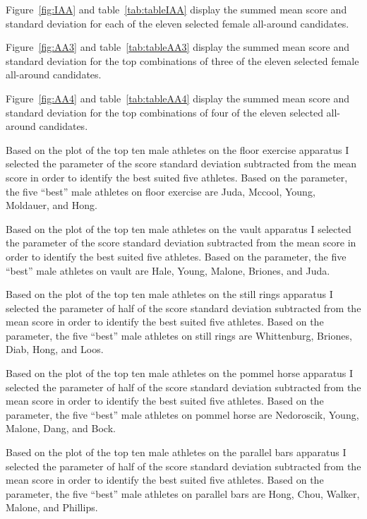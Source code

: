 \documentclass[12pt]{article}
\begin{document}
Figure~\ref{fig:IAA} and table~\ref{tab:tableIAA} display the summed mean score and standard deviation 
for each of the eleven selected female all-around candidates.





Figure~\ref{fig:AA3} and table~\ref{tab:tableAA3} display the summed mean score and standard deviation 
for the top combinations of three of the eleven selected female all-around candidates.



Figure~\ref{fig:AA4} and table~\ref{tab:tableAA4} display the summed mean score and standard deviation 
for the top combinations of four of the eleven selected all-around candidates.


  Based on the plot of the top ten male athletes on the floor exercise apparatus I selected the parameter of 
  the score standard deviation subtracted from the mean score in order to identify the best suited five 
  athletes. Based on the parameter, the five ``best'' male athletes on floor exercise are Juda, Mccool, Young, Moldauer, 
  and Hong.

  Based on the plot of the top ten male athletes on the vault apparatus I selected the parameter of 
  the score standard deviation subtracted from the mean score in order to identify the best suited five 
  athletes. Based on the parameter, the five ``best'' male athletes on vault are Hale, Young, Malone, Briones, and 
  Juda.

  Based on the plot of the top ten male athletes on the still rings apparatus I selected the parameter of 
  half of the score standard deviation subtracted from the mean score in order to identify the best suited five 
  athletes. Based on the parameter, the five ``best'' male athletes on still rings are Whittenburg, Briones, Diab, 
  Hong, and Loos.

  Based on the plot of the top ten male athletes on the pommel horse apparatus I selected the parameter of 
  half of the score standard deviation subtracted from the mean score in order to identify the best suited five 
  athletes. Based on the parameter, the five ``best'' male athletes on pommel horse are Nedoroscik, Young, Malone, 
  Dang, and Bock.

  Based on the plot of the top ten male athletes on the parallel bars apparatus I selected the parameter of 
  half of the score standard deviation subtracted from the mean score in order to identify the best suited five 
  athletes. Based on the parameter, the five ``best'' male athletes on parallel bars are Hong, Chou, Walker, Malone, 
  and Phillips.
\end{document}
